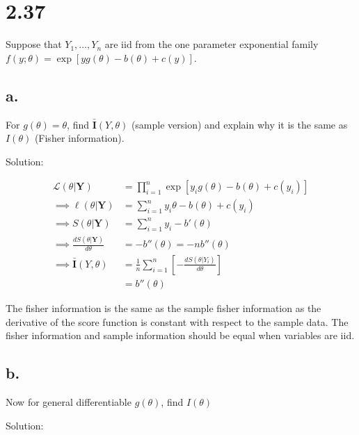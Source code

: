 \documentclass[
  letterpaper,
  DIV=11,
  numbers=noendperiod]{scrreprt}
\begin{document}
\newpage

\hypertarget{section-12}{%
\section{2.37}\label{section-12}}

Suppose that \(Y_1, \dots, Y_n\) are iid from the one parameter
exponential family \(f(y;\theta)= \exp[yg(\theta)-b(\theta)+c(y)]\).

\hypertarget{a.-3}{%
\subsection{a.}\label{a.-3}}

For \(g(\theta) = \theta\), find \(\bar{\mathbf{I}}(Y,\theta)\) (sample
version) and explain why it is the same as \(I(\theta)\) (Fisher
information).

Solution:

\[
\begin{aligned}
\mathcal L(\theta|\mathbf Y) &= \prod_{i=1}^n \exp[y_ig(\theta)-b(\theta)+c(y_i)] \\
\implies \ell (\theta | \mathbf Y) &= \sum_{i=1}^n y_i \theta-b(\theta)+c(y_i) \\
\implies S (\theta | \mathbf Y) &= \sum_{i=1}^n y_i -b'(\theta)\\
\implies \frac{d S (\theta | \mathbf Y)}{d \theta} &= -b''(\theta) = -nb''(\theta) \\
\implies \bar{\mathbf{I}}(Y,\theta) &= \frac{1}{n} \sum_{i=1}^n \left[-\frac{d S (\theta | Y_i)}{d \theta}\right] \\
&= b''(\theta)
\end{aligned}
\]

The fisher information is the same as the sample fisher information as
the derivative of the score function is constant with respect to the
sample data. The fisher information and sample information should be
equal when variables are iid.

\hypertarget{b.-3}{%
\subsection{b.}\label{b.-3}}

Now for general differentiable \(g(\theta)\), find \(I(\theta)\)

Solution:
\end{document}
